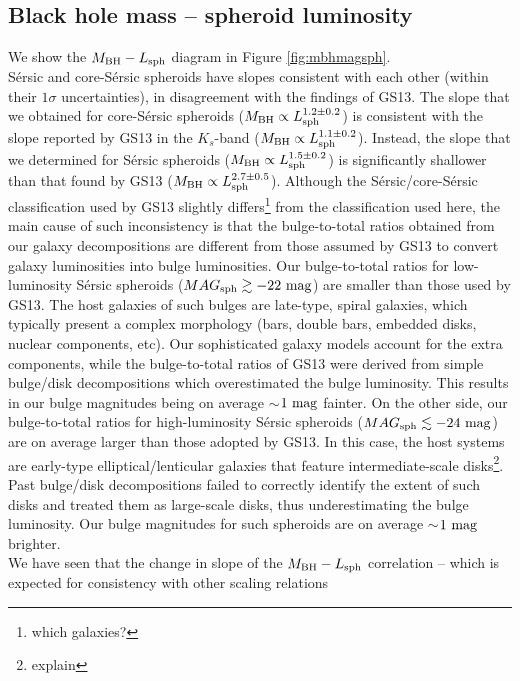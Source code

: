 \documentclass[preprint2]{emulateapj}
\begin{document}
\subsection{Black hole mass -- spheroid luminosity}
We show the $M_{\rm BH} - L_{\rm sph}$ diagram in Figure \ref{fig:mbhmagsph}. \\
S\'ersic and core-S\'ersic spheroids have slopes consistent with each other (within their $1\sigma$ uncertainties), 
in disagreement with the findings of GS13. 
The slope that we obtained for core-S\'ersic spheroids ($M_{\rm BH} \propto L_{\rm sph}^{1.2 \pm 0.2}$) 
is consistent with the slope reported by GS13 in the $K_s$-band ($M_{\rm BH} \propto L_{\rm sph}^{1.1 \pm 0.2}$). 
Instead, the slope that we determined for S\'ersic spheroids ($M_{\rm BH} \propto L_{\rm sph}^{1.5 \pm 0.2}$) 
is significantly shallower than that found by GS13 ($M_{\rm BH} \propto L_{\rm sph}^{2.7 \pm 0.5}$). 
Although the S\'ersic/core-S\'ersic classification used by GS13 slightly differs\footnote{which galaxies?} from the classification used here, 
the main cause of such inconsistency is that the bulge-to-total ratios obtained from our galaxy decompositions 
are different from those assumed by GS13 to convert galaxy luminosities into bulge luminosities.
Our bulge-to-total ratios for low-luminosity S\'ersic spheroids ($MAG_{\rm sph} \gtrsim -22 \rm~mag$) 
are smaller than those used by GS13. 
The host galaxies of such bulges are late-type, spiral galaxies, 
which typically present a complex morphology (bars, double bars, embedded disks, nuclear components, etc).
Our sophisticated galaxy models account for the extra components, 
while the bulge-to-total ratios of GS13 were derived from simple bulge/disk decompositions 
which overestimated the bulge luminosity.
This results in our bulge magnitudes being on average $\sim$$1\rm~mag$ fainter.
On the other side, our bulge-to-total ratios for high-luminosity S\'ersic spheroids ($MAG_{\rm sph} \lesssim -24 \rm~mag$) 
are on average larger than those adopted by GS13.
In this case, the host systems are early-type elliptical/lenticular galaxies that feature intermediate-scale disks\footnote{explain}.
Past bulge/disk decompositions failed to correctly identify the extent of such disks and treated them as large-scale disks, 
thus underestimating the bulge luminosity.
Our bulge magnitudes for such spheroids are on average $\sim$$1\rm~mag$ brighter. \\
We have seen that the change in slope of the $M_{\rm BH} - L_{\rm sph}$ correlation -- 
which is expected for consistency with other scaling relations 
\end{document}
